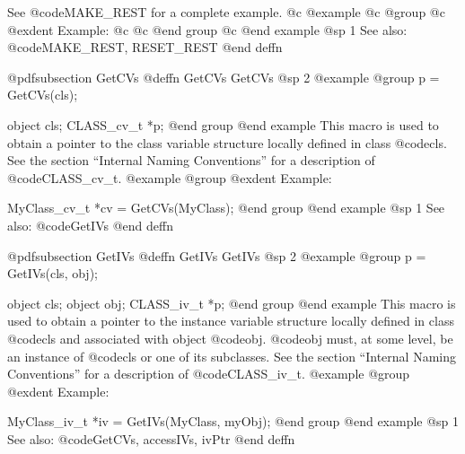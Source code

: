 {{{{See @code{MAKE_REST} for a complete example.
@c @example
@c @group
@c @exdent Example:
@c 
@c @end group
@c @end example
@sp 1
See also:  @code{MAKE_REST, RESET_REST}
@end deffn















@pdfsubsection {GetCVs}
@deffn {GetCVs} GetCVs
@sp 2
@example
@group
p = GetCVs(cls);

object       cls;
CLASS_cv_t  *p;
@end group
@end example
This macro is used to obtain a pointer to the class variable structure
locally defined in class @code{cls}.  See the section ``Internal Naming
Conventions'' for a description of @code{CLASS_cv_t}.
@example
@group
@exdent Example:

MyClass_cv_t  *cv = GetCVs(MyClass);
@end group
@end example
@sp 1
See also:  @code{GetIVs}
@end deffn
























@pdfsubsection {GetIVs}
@deffn {GetIVs} GetIVs
@sp 2
@example
@group
p = GetIVs(cls, obj);

object       cls;
object       obj;
CLASS_iv_t  *p;
@end group
@end example
This macro is used to obtain a pointer to the instance variable
structure locally defined in class @code{cls} and associated with object
@code{obj}.  @code{obj} must, at some level, be an instance of
@code{cls} or one of its subclasses.  See the section ``Internal Naming
Conventions'' for a description of @code{CLASS_iv_t}.
@example
@group
@exdent Example:

MyClass_iv_t  *iv = GetIVs(MyClass, myObj);
@end group
@end example
@sp 1
See also:  @code{GetCVs, accessIVs, ivPtr}
@end deffn




















}}}}
